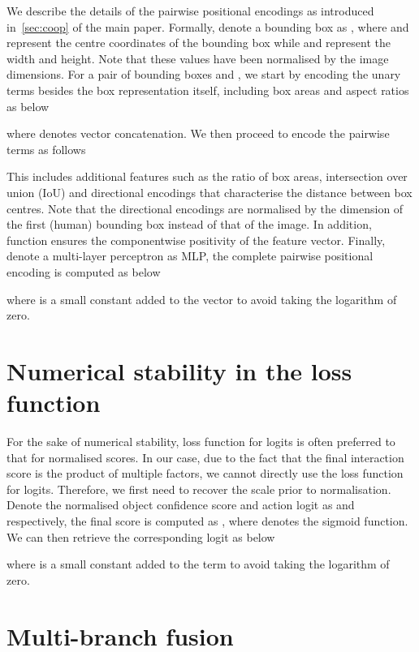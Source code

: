 \documentclass[10pt,twocolumn,letterpaper]{article}
\begin{document}
We describe the details of the pairwise positional encodings as introduced in~\cref{sec:coop} of the main paper. Formally, denote a bounding box as , where  and  represent the centre coordinates of the bounding box while  and  represent the width and height. Note that these values have been normalised by the image dimensions. For a pair of bounding boxes  and , we start by encoding the unary terms besides the box representation itself, including box areas and aspect ratios as below

where  denotes vector concatenation. We then proceed to encode the pairwise terms as follows

This includes additional features such as the ratio of box areas, intersection over union (IoU) and directional encodings that characterise the distance between box centres. Note that the directional encodings are normalised by the dimension of the first (human) bounding box instead of that of the image. In addition, function  ensures the componentwise positivity of the feature vector. Finally, denote a multi-layer perceptron as MLP, the complete pairwise positional encoding is computed as below

where  is a small constant added to the vector to avoid taking the logarithm of zero.

\section{Numerical stability in the loss function}
\label{app:loss}

For the sake of numerical stability, loss function for logits is often preferred to that for normalised scores. In our case, due to the fact that the final interaction score is the product of multiple factors, we cannot directly use the loss function for logits. Therefore, we first need to recover the scale prior to normalisation. Denote the normalised object confidence score and action logit as  and  respectively, the final score is computed as , where  denotes the sigmoid function. We can then retrieve the corresponding logit  as below

where  is a small constant added to the term to avoid taking the logarithm of zero.

\section{Multi-branch fusion}
\label{app:mbf}


\end{document}
